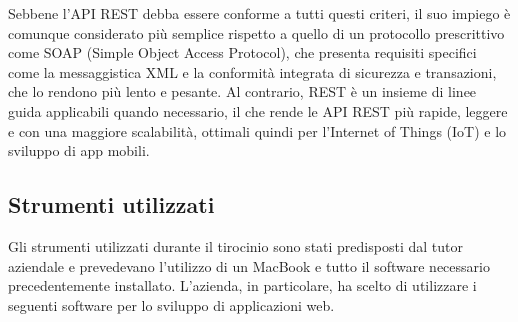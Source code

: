 \documentclass[12pt,a4paper]{article}
\begin{document}
Sebbene l'API REST debba essere conforme a tutti questi criteri, il suo impiego è comunque considerato più semplice rispetto a quello di un protocollo prescrittivo come SOAP (Simple Object Access Protocol), che presenta requisiti specifici come la messaggistica XML e la conformità integrata di sicurezza e transazioni, che lo rendono più lento e pesante.
Al contrario, REST è un insieme di linee guida applicabili quando necessario, il che rende le API REST più rapide, leggere e con una maggiore scalabilità, ottimali quindi per l'Internet of Things (IoT) e lo sviluppo di app mobili.

\subsection{Strumenti utilizzati}
Gli strumenti utilizzati durante il tirocinio sono stati predisposti dal tutor aziendale e prevedevano l’utilizzo di un MacBook e tutto il software necessario precedentemente installato.
L'azienda, in particolare, ha scelto di utilizzare i seguenti software per lo sviluppo di applicazioni web.
\end{document}
